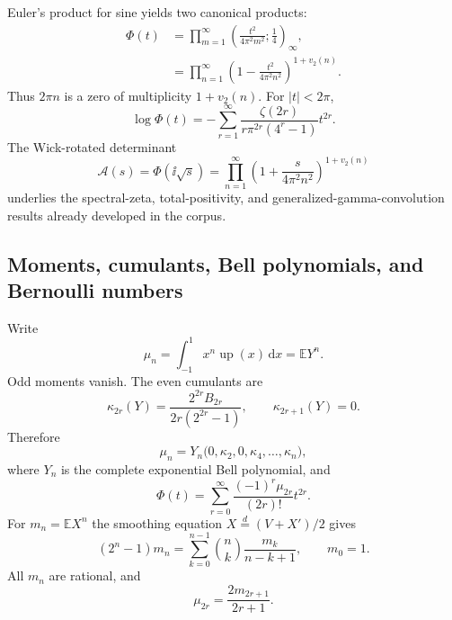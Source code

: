\documentclass[11pt]{article}
\theoremstyle{definition}
\theoremstyle{remark}
\newcommand{\E}{\mathbb E}
\newcommand{\dd}{\,\mathrm d}
\newcommand{\Up}{\operatorname{up}}
\begin{document}
Euler's product for sine yields two canonical products:
\begin{align}
 \Phi(t)
 &=\prod_{m=1}^\infty
   \left(\frac{t^2}{4\pi^2m^2};\frac14\right)_\infty,
 \label{p3:eq:qpoch-Phi}\\
 &=\prod_{n=1}^\infty
   \left(1-\frac{t^2}{4\pi^2n^2}\right)^{1+v_2(n)}.
 \label{p3:eq:zero-product}
\end{align}
Thus $2\pi n$ is a zero of multiplicity $1+v_2(n)$.  For $|t|<2\pi$,
\begin{equation}\label{p3:eq:log-Phi-zeta}
 \log\Phi(t)
 =-\sum_{r=1}^\infty
 \frac{\zeta(2r)}{r\pi^{2r}(4^r-1)}t^{2r}.
\end{equation}
The Wick-rotated determinant
\begin{equation}\label{p3:eq:wick-product}
 \mathcal A(s)=\Phi(\ii\sqrt{s})
 =\prod_{n=1}^\infty
 \left(1+\frac{s}{4\pi^2n^2}\right)^{1+v_2(n)}
\end{equation}
underlies the spectral-zeta, total-positivity, and generalized-gamma-convolution
results already developed in the corpus.

\subsection{Moments, cumulants, Bell polynomials, and Bernoulli numbers}

Write
\begin{equation}\label{p3:eq:central-moments}
 \mu_n=\int_{-1}^1x^n\Up(x)\dd x=\E Y^n.
\end{equation}
Odd moments vanish.  The even cumulants are
\begin{equation}\label{p3:eq:up-cumulants}
 \kappa_{2r}(Y)=\frac{2^{2r}B_{2r}}{2r(2^{2r}-1)},
 \qquad \kappa_{2r+1}(Y)=0.
\end{equation}
Therefore
\begin{equation}\label{p3:eq:Bell-moments}
 \mu_n=Y_n\bigl(0,\kappa_2,0,\kappa_4,\ldots,\kappa_n\bigr),
\end{equation}
where $Y_n$ is the complete exponential Bell polynomial, and
\begin{equation}\label{p3:eq:Phi-Taylor}
 \Phi(t)=\sum_{r=0}^\infty\frac{(-1)^r\mu_{2r}}{(2r)!}t^{2r}.
\end{equation}
For $m_n=\E X^n$ the smoothing equation
$X\overset d=(V+X')/2$ gives
\begin{equation}\label{p3:eq:Fabius-moment-recurrence}
 (2^n-1)m_n=\sum_{k=0}^{n-1}\binom nk\frac{m_k}{n-k+1},
 \qquad m_0=1.
\end{equation}
All $m_n$ are rational, and
\begin{equation}\label{p3:eq:central-one-sided-moment}
 \mu_{2r}=\frac{2m_{2r+1}}{2r+1}.
\end{equation}
\end{document}
